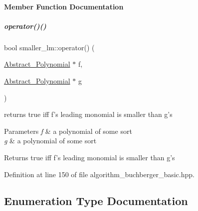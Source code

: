 \paragraph{Member Function Documentation}
\mbox{\label{group___g_b_computation_a683ffd0302d029cd21c5bafdf4335785}} 
\subparagraph{\texorpdfstring{operator()()}{operator()()}}
{\footnotesize\ttfamily bool smaller\+\_\+lm\+::operator() (\begin{DoxyParamCaption}\item[{\hyperlink{group__polygroup_class_abstract___polynomial}{Abstract\+\_\+\+Polynomial} $\ast$}]{f,  }\item[{\hyperlink{group__polygroup_class_abstract___polynomial}{Abstract\+\_\+\+Polynomial} $\ast$}]{g }\end{DoxyParamCaption})\hspace{0.3cm}{\ttfamily [inline]}}



returns {\ttfamily true} iff {\ttfamily f's} leading monomial is smaller than {\ttfamily g's} 


\begin{DoxyParams}{Parameters}
{\em f} & a polynomial of some sort \\
\hline
{\em g} & a polynomial of some sort \\
\hline
\end{DoxyParams}
\begin{DoxyReturn}{Returns}
{\ttfamily true} iff {\ttfamily f's} leading monomial is smaller than {\ttfamily g's} 
\end{DoxyReturn}


Definition at line 150 of file algorithm\+\_\+buchberger\+\_\+basic.\+hpp.



\subsection{Enumeration Type Documentation}
\mbox{\label{group___g_b_computation_ga819b1fd40d9a40ff303df3b90647ecb0}} 
